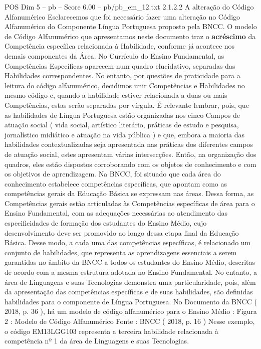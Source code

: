\begin{textsample}{POS Dim 5 – pb – Score 6.00 – pb/pb\_em\_12.txt}  \label{ex:f5_pos_100}
2.1.2.2 A alteração do Código Alfanumérico Esclarecemos que foi necessário fazer uma alteração no Código Alfanumérico do Componente Língua Portuguesa proposto pela BNCC.
O modelo de Código Alfanumérico que apresentamos neste documento traz o \textbf{acréscimo} da Competência específica relacionada à Habilidade, conforme já acontece nos demais componentes da Área.
No Currículo do Ensino Fundamental, as Competências Específicas aparecem num quadro elucidativo, separadas das Habilidades correspondentes.
No entanto, por questões de praticidade para a leitura do código alfanumérico, decidimos unir Competências e Habilidades no mesmo código e, quando a habilidade estiver relacionada a duas ou mais Competências, estas serão separadas por vírgula.
É relevante lembrar, pois, que as habilidades de Língua Portuguesa estão organizadas nos cinco Campos de atuação social ( vida social, artístico literário, práticas de estudo e pesquisa, jornalístico midiático e atuação na vida pública ) e que, embora a maioria das habilidades contextualizadas seja apresentada nas práticas dos diferentes campos de atuação social, estes apresentam várias intersecções.
Então, na organização dos quadros, eles estão dispostos corroborando com os objetos de conhecimento e com os objetivos de aprendizagem.
Na BNCC, foi situado que cada área do conhecimento estabelece competências específicas, que apontam como as competências gerais da Educação Básica se expressam nas áreas.
Dessa forma, as Competências gerais estão articuladas às Competências específicas de área para o Ensino Fundamental, com as adequações necessárias ao atendimento das especificidades de formação dos estudantes do Ensino Médio, cujo desenvolvimento deve ser promovido ao longo dessa etapa final da Educação Básica.
Desse modo, a cada uma das competências específicas, é relacionado um conjunto de habilidades, que representa as aprendizagens essenciais a serem garantidas no âmbito da BNCC a todos os estudantes do Ensino Médio, descritas de acordo com a mesma estrutura adotada no Ensino Fundamental.
No entanto, a área de Linguagens e suas Tecnologias demonstra uma particularidade, pois, além da apresentação das competências específicas e de suas habilidades, são definidas habilidades para o componente de Língua Portuguesa.
No Documento da BNCC ( 2018, p. 36 ), há um modelo de código alfanumérico para o Ensino Médio : Figura 2 : Modelo de Código Alfanumérico Fonte : BNCC ( 2018, p. 16 ) Nesse exemplo, o código EM13LGG103 representa a terceira habilidade relacionada à competência nº 1 da área de Linguagens e suas Tecnologias.

\end{textsample}
